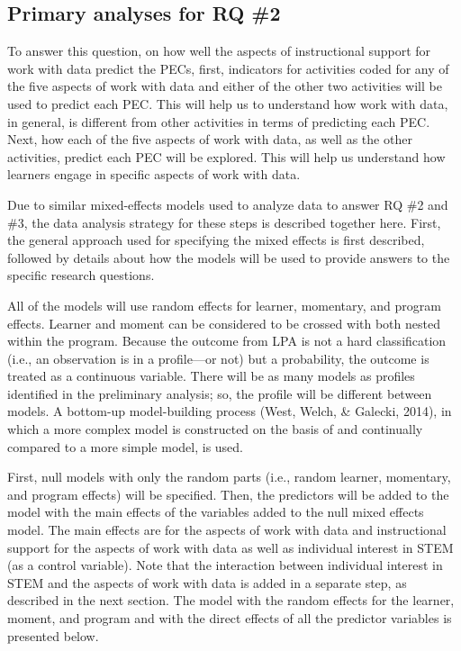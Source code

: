 \documentclass[]{book}
\theoremstyle{definition}
\theoremstyle{definition}
\theoremstyle{definition}
\theoremstyle{remark}
\begin{document}
\subsection{Primary analyses for RQ
\#2}\label{primary-analyses-for-rq-2}

To answer this question, on how well the aspects of instructional
support for work with data predict the PECs, first, indicators for
activities coded for any of the five aspects of work with data and
either of the other two activities will be used to predict each PEC.
This will help us to understand how work with data, in general, is
different from other activities in terms of predicting each PEC. Next,
how each of the five aspects of work with data, as well as the other
activities, predict each PEC will be explored. This will help us
understand how learners engage in specific aspects of work with data.

Due to similar mixed-effects models used to analyze data to answer RQ
\#2 and \#3, the data analysis strategy for these steps is described
together here. First, the general approach used for specifying the mixed
effects is first described, followed by details about how the models
will be used to provide answers to the specific research questions.

All of the models will use random effects for learner, momentary, and
program effects. Learner and moment can be considered to be crossed with
both nested within the program. Because the outcome from LPA is not a
hard classification (i.e., an observation is in a profile---or not) but
a probability, the outcome is treated as a continuous variable. There
will be as many models as profiles identified in the preliminary
analysis; so, the profile will be different between models. A bottom-up
model-building process (West, Welch, \& Galecki, 2014), in which a more
complex model is constructed on the basis of and continually compared to
a more simple model, is used.

First, null models with only the random parts (i.e., random learner,
momentary, and program effects) will be specified. Then, the predictors
will be added to the model with the main effects of the variables added
to the null mixed effects model. The main effects are for the aspects of
work with data and instructional support for the aspects of work with
data as well as individual interest in STEM (as a control variable).
Note that the interaction between individual interest in STEM and the
aspects of work with data is added in a separate step, as described in
the next section. The model with the random effects for the learner,
moment, and program and with the direct effects of all the predictor
variables is presented below.
\end{document}
